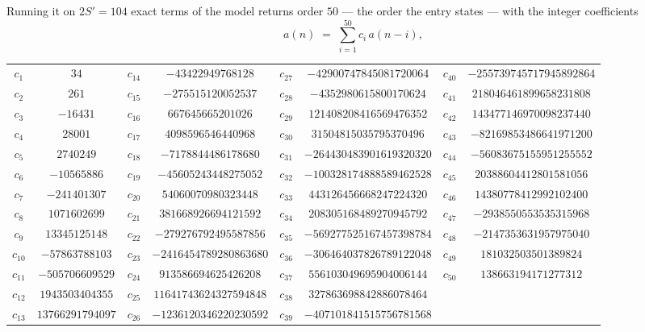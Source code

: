 \documentclass[11pt,a4paper]{article}
\theoremstyle{plain}
\theoremstyle{definition}
\begin{document}
Running it on $2S'=104$ exact terms of the model returns order $50$ --- the order the
entry states --- with the integer coefficients
\[
a(n)\;=\;\sum_{i=1}^{50}c_i\,a(n-i),
\]
\begin{center}\small
\begin{tabular}{cccccccc}
$c_{1}$ & $34$ & $c_{14}$ & $-43422949768128$ & $c_{27}$ & $-42900747845081720064$ & $c_{40}$ & $-255739745717945892864$ \\
$c_{2}$ & $261$ & $c_{15}$ & $-275515120052537$ & $c_{28}$ & $-4352980615800170624$ & $c_{41}$ & $218046461899658231808$ \\
$c_{3}$ & $-16431$ & $c_{16}$ & $667645665201026$ & $c_{29}$ & $121408208416569476352$ & $c_{42}$ & $143477146970098237440$ \\
$c_{4}$ & $28001$ & $c_{17}$ & $4098596546440968$ & $c_{30}$ & $31504815035795370496$ & $c_{43}$ & $-82169853486641971200$ \\
$c_{5}$ & $2740249$ & $c_{18}$ & $-7178844486178680$ & $c_{31}$ & $-264430483901619320320$ & $c_{44}$ & $-56083675155951255552$ \\
$c_{6}$ & $-10565886$ & $c_{19}$ & $-45605243448275052$ & $c_{32}$ & $-100328174888589462528$ & $c_{45}$ & $20388604412801581056$ \\
$c_{7}$ & $-241401307$ & $c_{20}$ & $54060070980323448$ & $c_{33}$ & $443126456668247224320$ & $c_{46}$ & $14380778412992102400$ \\
$c_{8}$ & $1071602699$ & $c_{21}$ & $381668926694121592$ & $c_{34}$ & $208305168489270945792$ & $c_{47}$ & $-2938550553535315968$ \\
$c_{9}$ & $13345125148$ & $c_{22}$ & $-279276792495587856$ & $c_{35}$ & $-569277525167457398784$ & $c_{48}$ & $-2147353631957975040$ \\
$c_{10}$ & $-57863788103$ & $c_{23}$ & $-2416454789280863680$ & $c_{36}$ & $-306464037826789122048$ & $c_{49}$ & $181032503501389824$ \\
$c_{11}$ & $-505706609529$ & $c_{24}$ & $913586694625426208$ & $c_{37}$ & $556103049695904006144$ & $c_{50}$ & $138663194171277312$ \\
$c_{12}$ & $1943503404355$ & $c_{25}$ & $11641743624327594848$ & $c_{38}$ & $327863698842886078464$ &  &  \\
$c_{13}$ & $13766291794097$ & $c_{26}$ & $-1236120346220230592$ & $c_{39}$ & $-407101841515756781568$ &  &  \\
\end{tabular}
\end{center}
\end{document}
